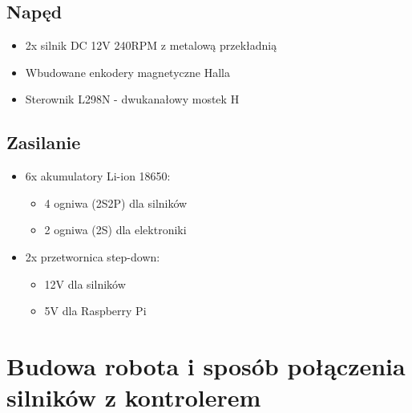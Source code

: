 \documentclass[a4paper,twoside,12pt]{book}
\begin{document}
\subsection{Napęd}
\begin{itemize}
\item 2x silnik DC 12V 240RPM z metalową przekładnią
\item Wbudowane enkodery magnetyczne Halla


\item Sterownik L298N - dwukanałowy mostek H \newline

\end{itemize}


\subsection{Zasilanie}
\begin{itemize}
\item 6x akumulatory Li-ion 18650:
	\begin{itemize}
	\item 4 ogniwa (2S2P) dla silników
	\item 2 ogniwa (2S) dla elektroniki
	\end{itemize}
	

\item 2x przetwornica step-down:
	\begin{itemize}
	\item 12V dla silników
	\item 5V dla Raspberry Pi
	\end{itemize}

		\newpage
\end{itemize}



\section{Budowa robota i sposób połączenia silników z kontrolerem}
\end{document}
